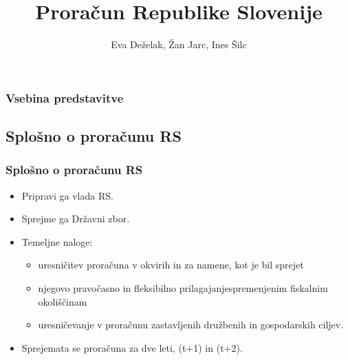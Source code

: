 \documentclass[10pt]{beamer}
\begin{document}
\title[Proračun Republike Slovenije]{Proračun Republike Slovenije}
\author{Eva Deželak, Žan Jarc, Ines Šilc}


\begin{frame}
	\titlepage
\end {frame}

\begin{frame}
	\frametitle{Vsebina predstavitve}
	\tableofcontents
\end {frame}

\begin{frame}
\section[Splošno o proračunu RS]{Splošno o proračunu RS}
\frametitle{Splošno o proračunu RS}
\begin{itemize}
\item Pripravi ga vlada RS.
\item Sprejme ga Državni zbor.
\item Temeljne naloge: 
\begin{itemize}
\item uresničitev proračuna v okvirih in za namene, kot je bil sprejet
\item njegovo pravočasno in fleksibilno prilagajanjespremenjenim fiskalnim okoliščinam
\item uresničevanje v proračunu zastavljenih družbenih in gospodarskih ciljev.
\end{itemize}
\item Sprejemata se proračuna za dve leti, (t+1) in (t+2).
\end{itemize}
\end{frame}
\end{document}
